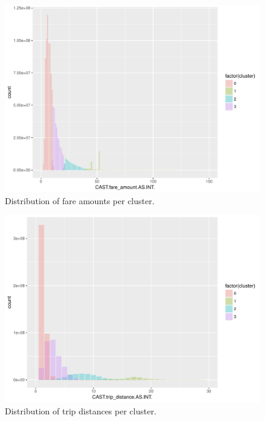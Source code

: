 \documentclass{acm_proc_article-sp-sigmod09}
\begin{document}
\begin{figure}
	\centering
	\includegraphics[width=1\columnwidth]{resources/clustered_plots/fare_amount_distr.pdf}
	\caption{Distribution of fare amounts per cluster.}
	\label{fig:FareAmountDistr}
\end{figure}

\begin{figure}
	\centering
	\includegraphics[width=1\columnwidth]{resources/clustered_plots/trip_distance_distr.pdf}
	\caption{Distribution of trip distances per cluster.}
	\label{fig:TripDistanceDistr}
\end{figure}
\end{document}

